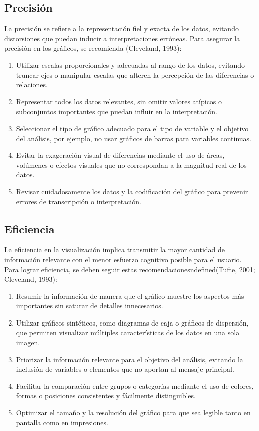 \documentclass[
  spanish,
  a4paper,
  DIV=11,
  numbers=noendperiod,
  onepage,
  openany]{scrreprt}
\begin{document}
\subsection{Precisión}\label{precisiuxf3n}

La precisión se refiere a la representación fiel y exacta de los datos,
evitando distorsiones que puedan inducir a interpretaciones erróneas.
Para asegurar la precisión en los gráficos, se recomienda (Cleveland,
1993):

\begin{enumerate}
\def\labelenumi{\arabic{enumi}.}
\item
  Utilizar escalas proporcionales y adecuadas al rango de los datos,
  evitando truncar ejes o manipular escalas que alteren la percepción de
  las diferencias o relaciones.
\item
  Representar todos los datos relevantes, sin omitir valores atípicos o
  subconjuntos importantes que puedan influir en la interpretación.
\item
  Seleccionar el tipo de gráfico adecuado para el tipo de variable y el
  objetivo del análisis, por ejemplo, no usar gráficos de barras para
  variables continuas.
\item
  Evitar la exageración visual de diferencias mediante el uso de áreas,
  volúmenes o efectos visuales que no correspondan a la magnitud real de
  los datos.
\item
  Revisar cuidadosamente los datos y la codificación del gráfico para
  prevenir errores de transcripción o interpretación.
\end{enumerate}

\subsection{Eficiencia}\label{eficiencia}

La eficiencia en la visualización implica transmitir la mayor cantidad
de información relevante con el menor esfuerzo cognitivo posible para el
usuario. Para lograr eficiencia, se deben seguir estas
recomendacionesndefined(Tufte, 2001; Cleveland, 1993):

\begin{enumerate}
\def\labelenumi{\arabic{enumi}.}
\item
  Resumir la información de manera que el gráfico muestre los aspectos
  más importantes sin saturar de detalles innecesarios.
\item
  Utilizar gráficos sintéticos, como diagramas de caja o gráficos de
  dispersión, que permiten visualizar múltiples características de los
  datos en una sola imagen.
\item
  Priorizar la información relevante para el objetivo del análisis,
  evitando la inclusión de variables o elementos que no aportan al
  mensaje principal.
\item
  Facilitar la comparación entre grupos o categorías mediante el uso de
  colores, formas o posiciones consistentes y fácilmente distinguibles.
\item
  Optimizar el tamaño y la resolución del gráfico para que sea legible
  tanto en pantalla como en impresiones.
\end{enumerate}
\end{document}
